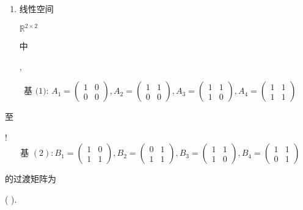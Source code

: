 \documentclass[10pt]{article}
\begin{document}
\begin{enumerate}
  \item \begin{CJK}{UTF8}{mj}线性空间\end{CJK} $\mathbb{R}^{2 \times 2}$ \begin{CJK}{UTF8}{mj}中\end{CJK},

\end{enumerate}
$$
\text { 基 (1): } A_{1}=\left(\begin{array}{ll}
1 & 0 \\
0 & 0
\end{array}\right), A_{2}=\left(\begin{array}{cc}
1 & 1 \\
0 & 0
\end{array}\right), A_{3}=\left(\begin{array}{ll}
1 & 1 \\
1 & 0
\end{array}\right), A_{4}=\left(\begin{array}{ll}
1 & 1 \\
1 & 1
\end{array}\right)
$$
\begin{CJK}{UTF8}{mj}至\end{CJK}!
$$
\text { 基 }(2): B_{1}=\left(\begin{array}{ll}
1 & 0 \\
1 & 1
\end{array}\right), B_{2}=\left(\begin{array}{ll}
0 & 1 \\
1 & 1
\end{array}\right), B_{3}=\left(\begin{array}{cc}
1 & 1 \\
1 & 0
\end{array}\right), B_{4}=\left(\begin{array}{ll}
1 & 1 \\
0 & 1
\end{array}\right)
$$
\begin{CJK}{UTF8}{mj}的过渡矩阵为\end{CJK} ( ).
\end{document}
